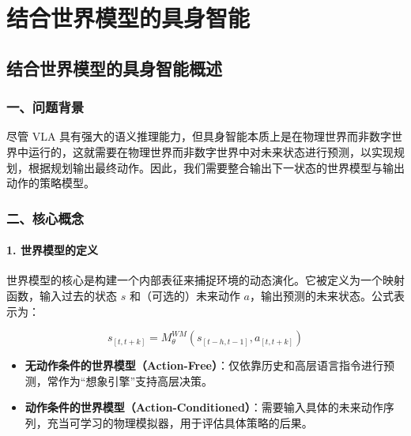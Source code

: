 \hypertarget{ux7ed3ux5408ux4e16ux754cux6a21ux578bux7684ux5177ux8eabux667aux80fd}{%
\chapter{结合世界模型的具身智能}\label{ux7ed3ux5408ux4e16ux754cux6a21ux578bux7684ux5177ux8eabux667aux80fd}}

\hypertarget{ux7ed3ux5408ux4e16ux754cux6a21ux578bux7684ux5177ux8eabux667aux80fdux6982ux8ff0}{%
\section{结合世界模型的具身智能概述}\label{ux7ed3ux5408ux4e16ux754cux6a21ux578bux7684ux5177ux8eabux667aux80fdux6982ux8ff0}}

\hypertarget{ux4e00ux95eeux9898ux80ccux666f-16}{%
\subsection{一、问题背景}\label{ux4e00ux95eeux9898ux80ccux666f-16}}

尽管 VLA 具有强大的语义推理能力，但具身智能本质上是在物理世界而非数字世界中运行的，这就需要在物理世界而非数字世界中对未来状态进行预测，以实现规划，根据规划输出最终动作。因此，我们需要整合输出下一状态的世界模型与输出动作的策略模型。

\hypertarget{ux4e8cux6838ux5fc3ux6982ux5ff5-1}{%
\subsection{二、核心概念}\label{ux4e8cux6838ux5fc3ux6982ux5ff5-1}}

\hypertarget{ux4e16ux754cux6a21ux578bux7684ux5b9aux4e49}{%
\subsubsection{1. 世界模型的定义}\label{ux4e16ux754cux6a21ux578bux7684ux5b9aux4e49}}

世界模型的核心是构建一个内部表征来捕捉环境的动态演化。它被定义为一个映射函数，输入过去的状态 \(s\) 和（可选的）未来动作 \(a\)，输出预测的未来状态。公式表示为：

\[
s_{[t,t+k]} = M_{\theta}^{WM}\left(s_{[t-h,t-1]}, a_{[t,t+k]}\right)
\]

\begin{itemize}
\tightlist
\item
  \textbf{无动作条件的世界模型（Action-Free）}：仅依靠历史和高层语言指令进行预测，常作为``想象引擎''支持高层决策。
\item
  \textbf{动作条件的世界模型（Action-Conditioned）}：需要输入具体的未来动作序列，充当可学习的物理模拟器，用于评估具体策略的后果。
\end{itemize}

